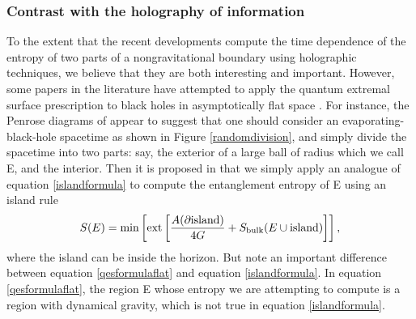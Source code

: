 \documentclass[12pt]{article}
\def\gnewt{G}
\newcommand{\be}{\begin{equation}}
\newcommand{\ee}{\end{equation}}
\begin{document}
\subsubsection{Contrast with the holography of information}
To the extent that the recent developments compute the time dependence of the entropy of two parts of a nongravitational boundary using holographic techniques, we believe that they are both interesting and important. However, some papers in the literature have  attempted to apply the quantum extremal surface prescription to black holes in asymptotically flat space \cite{Krishnan:2020oun,Hashimoto:2020cas,Gautason:2020tmk,Alishahiha:2020qza}. For instance, the Penrose diagrams of   \cite{Almheiri:2020cfm} appear to suggest that one should consider an evaporating-black-hole spacetime as shown in Figure \ref{randomdivision}, and simply divide the spacetime into two parts: say, the exterior of a large ball of radius which we call E, and the interior. Then it is proposed in \cite{Almheiri:2020cfm} that we simply apply an analogue of equation \eqref{islandformula} to compute the entanglement entropy of E using an island rule
\be
\label{qesformulaflat}
S(E) = \text{min}\left[ \text{ext} \left[{A(\partial \text{island}) \over 4 \gnewt} + S_{\text{bulk}}(E \cup \text{island}) \right]\right],
\ee
where the island can be inside the horizon.
But note an important difference between equation \eqref{qesformulaflat} and equation \eqref{islandformula}. In equation \eqref{qesformulaflat}, the region E whose entropy we are attempting to compute is a region with dynamical gravity, which is not true in equation \eqref{islandformula}.
\end{document}
